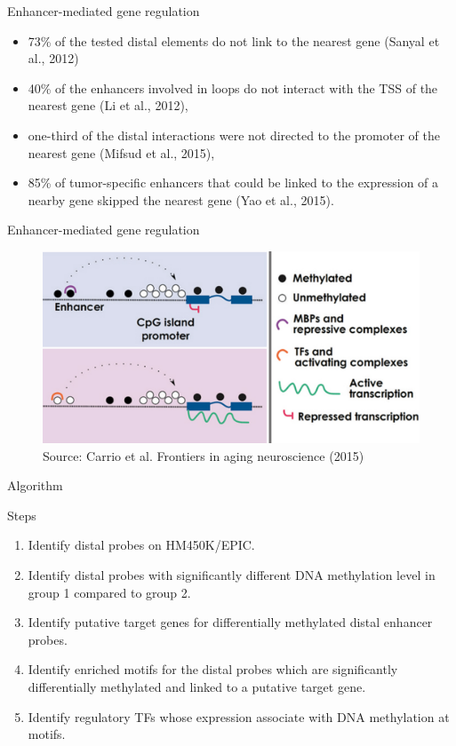 \documentclass[slidestop,compress,11pt,xcolor=dvipsnames]{beamer}
\begin{document}
\begin{frame}{Enhancer-mediated gene regulation}
 \begin{itemize}
  \item 73\% of the tested distal elements do not link to the nearest gene (Sanyal et al., 2012)
  \item 40\% of the enhancers involved in loops do not interact with the TSS of the nearest gene (Li et al., 2012),
  \item one-third of the distal interactions were not directed to the promoter of the nearest gene (Mifsud et al., 2015),
  \item 85\% of tumor-specific enhancers that could be linked to the expression of a nearby gene skipped the nearest gene (Yao et al., 2015).
 \end{itemize}
\end{frame}

\begin{frame}{Enhancer-mediated gene regulation}
 \vspace*{-0.1cm}
 \begin{figure}
  \centering
  \includegraphics[width=1.0\linewidth]{ELMER/dna_met.png}{\tiny{\\Source: Carrio et al. Frontiers in aging neuroscience (2015)}}
 \end{figure}
\end{frame}



\begin{frame}{Algorithm}

\begin{exampleblock}{Steps}
\begin{enumerate}
\item  Identify distal probes on HM450K/EPIC.
\item  Identify distal probes with significantly different DNA methylation level in  group 1 compared to group 2.
\item  Identify putative target genes for differentially methylated distal enhancer probes.
\item  Identify enriched motifs for the distal  probes which are significantly differentially methylated and linked to a putative target gene.
\item  Identify regulatory TFs whose expression associate with DNA methylation at motifs.
\end{enumerate}

\end{exampleblock}
\end{frame}
\end{document}
